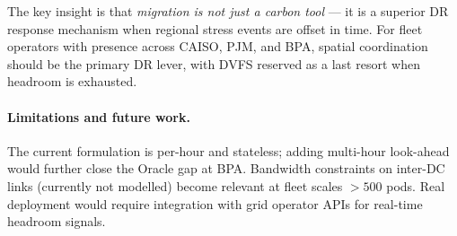 \documentclass[sigplan,10pt,review]{acmart}
\begin{document}
The key insight is that \emph{migration is not just a carbon tool} — it is a
superior DR response mechanism when regional stress events are offset in time.
For fleet operators with presence across CAISO, PJM, and BPA, spatial
coordination should be the primary DR lever, with DVFS reserved as a last
resort when headroom is exhausted.

\paragraph{Limitations and future work.}
The current formulation is per-hour and stateless; adding multi-hour
look-ahead would further close the Oracle gap at BPA.  Bandwidth constraints
on inter-DC links (currently not modelled) become relevant at fleet scales
$>500$ pods.  Real deployment would require integration with grid operator
APIs for real-time headroom signals.



\end{document}
